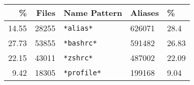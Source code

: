 \begin{tabular}{rrlll}
    \toprule
             \% &         Files &           Name Pattern &        Aliases &           \% \\
    \midrule
    \num{14.55} &  \num{28255}  &         \verb|*alias*| &  \num{626071}  &   \num{28.4} \\
    \num{27.73} &  \num{53855}  &        \verb|*bashrc*| &  \num{591482}  &  \num{26.83} \\
    \num{22.15} &  \num{43011}  &         \verb|*zshrc*| &  \num{487002}  &  \num{22.09} \\
     \num{9.42} &  \num{18305}  &       \verb|*profile*| &  \num{199168}  &   \num{9.04} \\
    \bottomrule
\end{tabular}
